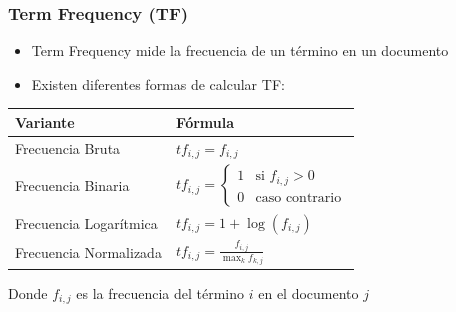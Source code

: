 \documentclass[handout]{beamer}
\begin{document}
\begin{frame}\frametitle{Term Frequency (TF)}
\begin{itemize}
    \item Term Frequency mide la frecuencia de un término en un documento
    \item Existen diferentes formas de calcular TF:
\end{itemize}

\begin{table}[h]
\centering
\begin{tabular}{|l|l|}
\hline
\textbf{Variante} & \textbf{Fórmula} \\
\hline
Frecuencia Bruta & $tf_{i,j} = f_{i,j}$ \\
\hline
Frecuencia Binaria & $tf_{i,j} = \begin{cases} 1 & \text{si } f_{i,j} > 0 \\ 0 & \text{caso contrario} \end{cases}$ \\
\hline
Frecuencia Logarítmica & $tf_{i,j} = 1 + \log(f_{i,j})$ \\
\hline
Frecuencia Normalizada & $tf_{i,j} = \frac{f_{i,j}}{\max_k f_{k,j}}$ \\
\hline
\end{tabular}
\end{table}

Donde $f_{i,j}$ es la frecuencia del término $i$ en el documento $j$
\end{frame}
\end{document}

